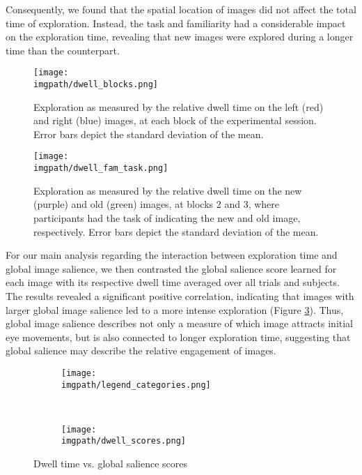 {Consequently, we found that the spatial location of images did not affect the total time of exploration. Instead, the task and familiarity had a considerable impact on the exploration time, revealing that new images were explored during a longer time than the counterpart.

\begin{figure}[ht]
  \centering
  \texttt{[image: \\imgpath/dwell\_blocks.png]}
  \caption{Exploration as measured by the relative dwell time on the left (red) and right (blue) images, at each block of the experimental session. Error bars depict the standard deviation of the mean.}
\label{fig:globsal-dwell_blocks}
\end{figure}

\begin{figure}[ht]
  \centering
  \texttt{[image: \\imgpath/dwell\_fam\_task.png]}
  \caption{Exploration as measured by the relative dwell time on the new (purple) and old (green) images, at blocks 2 and 3, where participants had the task of indicating the new and old image, respectively. Error bars depict the standard deviation of the mean.}
\label{fig:globsal-dwell_fam_task}
\end{figure}

For our main analysis regarding the interaction between exploration time and global image salience, we then contrasted the global salience score learned for each image with its respective dwell time averaged over all trials and subjects. The results revealed a significant positive correlation, indicating that images with larger global image salience led to a more intense exploration (Figure \ref{fig:globsal-dwell_scores}). Thus, global image salience describes not only a measure of which image attracts initial eye movements, but is also connected to longer exploration time, suggesting that global salience may describe the relative engagement of images. 

\begin{figure}[ht]
  \centering
  \begin{subfigure}{0.6 \linewidth}
      \texttt{[image: \\imgpath/legend\_categories.png]}
  \end{subfigure}
  \\
  \begin{subfigure}{0.6 \linewidth}
      \texttt{[image: \\imgpath/dwell\_scores.png]}
  \end{subfigure}
  \caption{Dwell time vs. global salience scores}
\label{fig:globsal-dwell_scores}
\end{figure}

}
